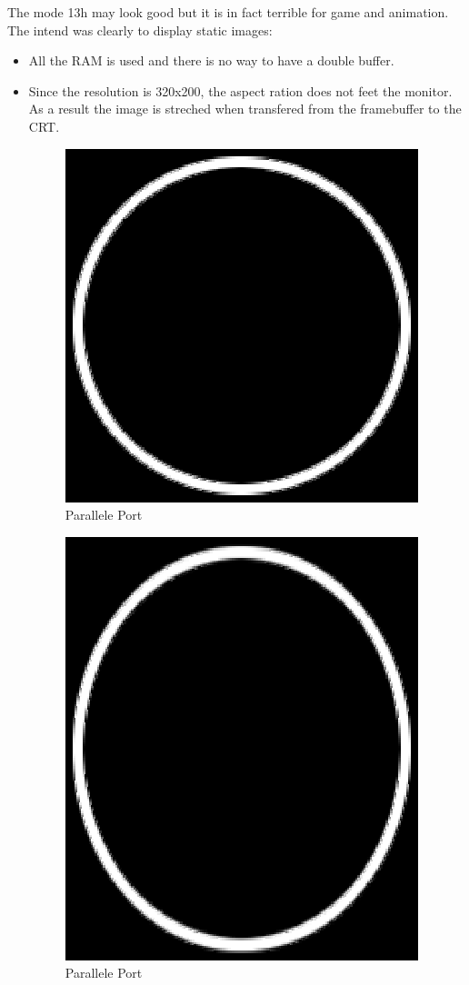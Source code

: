 \documentclass[book.tex]{subfiles}
\begin{document}
  
  The mode 13h may look good but it is in fact terrible for game and animation. The intend was clearly to display static images:
  \begin{itemize}
\item All the RAM is used and there is no way to have a double buffer.
\item Since the resolution is 320x200, the aspect ration does not feet the monitor. As a result the image is streched when transfered from the 
framebuffer to the CRT.

 \begin{figure}[H]
\centering
\includegraphics[scale=1.0]{imgs/circleframebuffer.eps}
%
\caption{Parallele Port}
\label{fig:parallelPort}
\end{figure}

 \begin{figure}[H]
\centering
\includegraphics[scale=1.0]{imgs/circlescreen.eps}
%
\caption{Parallele Port}
\label{fig:parallelPort}
\end{figure}


\end{itemize}
\end{document}
